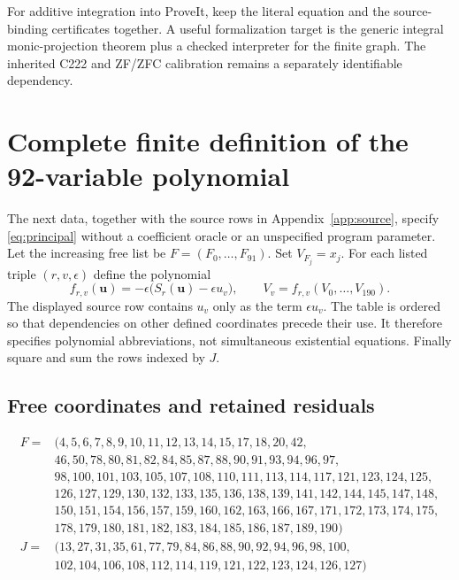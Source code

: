 \documentclass[11pt]{article}
\begin{document}
For additive integration into ProveIt, keep the literal equation and
the source-binding certificates together. A useful formalization target
is the generic integral monic-projection theorem plus a checked
interpreter for the finite graph. The inherited C222 and ZF/ZFC
calibration remains a separately identifiable dependency.

\appendix
\section{Complete finite definition of the 92-variable polynomial}
\label{app:definition}

The next data, together with the source rows in Appendix~\ref{app:source},
specify \eqref{eq:principal} without a coefficient oracle or an
unspecified program parameter. Let the increasing free list be
$F=(F_0,\ldots,F_{91})$. Set $V_{F_j}=x_j$. For each listed triple
$(r,v,\epsilon)$ define the polynomial
\[
 f_{r,v}(\boldsymbol u)=-\epsilon
       \bigl(S_r(\boldsymbol u)-\epsilon u_v\bigr),\qquad
 V_v=f_{r,v}(V_0,\ldots,V_{190}).
\]
The displayed source row contains $u_v$ only as the term
$\epsilon u_v$. The table is ordered so that dependencies on other
defined coordinates precede their use. It therefore specifies
polynomial abbreviations, not simultaneous existential equations.
Finally square and sum the rows indexed by $J$.
\subsection*{Free coordinates and retained residuals}
\begin{align*}
F={}&(4,5,6,7,8,9,10,11,12,13,14,15,17,18,20,42,\\
&{}46,50,78,80,81,82,84,85,87,88,90,91,93,94,96,97,\\
&{}98,100,101,103,105,107,108,110,111,113,114,117,121,123,124,125,\\
&{}126,127,129,130,132,133,135,136,138,139,141,142,144,145,147,148,\\
&{}150,151,154,156,157,159,160,162,163,166,167,171,172,173,174,175,\\
&{}178,179,180,181,182,183,184,185,186,187,189,190)\\
J={}&(13,27,31,35,61,77,79,84,86,88,90,92,94,96,98,100,\\
&{}102,104,106,108,112,114,119,121,122,123,124,126,127)\\
\end{align*}
\end{document}
